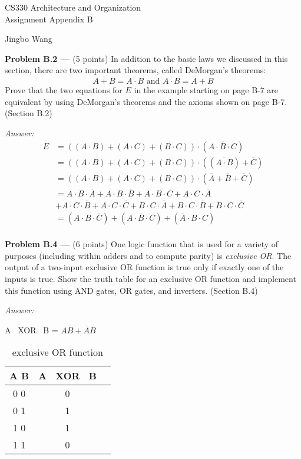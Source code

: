 \documentclass[11pt]{article}
\newcommand{\problem}[1]{\textbf{Problem #1 ---} }
\newcommand{\answer}{{\color{red}\textit{Answer: }}}
\begin{document}
\thispagestyle{empty}

\begin{center}
{\large CS330 Architecture and Organization}\\
Assignment Appendix B
\end{center}

\begin{flushright}
Jingbo Wang
\end{flushright}

\problem{B.2}(5 points) In addition to the basic laws we discussed in this section, there are two important theorems, called DeMorgan's theorems:
\[ \overline{A+B} = \overline{A}\cdot\overline{B} \text{ and } \overline{A\cdot B}=\overline{A}+\overline{B} \]
Prove that the two equations for $E$ in the example starting on page B-7 are equivalent by using DeMorgan's theorems and the axioms shown on page B-7. (Section B.2)

\answer
\begin{align*}
    E &= ((A\cdot B)+(A \cdot C)+(B \cdot C))\cdot(\overline{A\cdot B \cdot C}) \\
      &= ((A\cdot B)+(A \cdot C)+(B \cdot C))\cdot((\overline{A \cdot B}) + \overline{C}) \\
      &= ((A\cdot B)+(A \cdot C)+(B \cdot C))\cdot(\overline{A} + \overline{B} +         
         \overline{C}) \\
      &= A \cdot B \cdot \overline{A} + A \cdot B \cdot \overline{B} + A \cdot B \cdot 
         \overline{C} + A \cdot C \cdot \overline{A}\\
      &+ A \cdot C \cdot \overline{B} + A \cdot C 
      \cdot \overline{C} + B \cdot C \cdot \overline{A} + B \cdot C \cdot \overline{B} 
      + B \cdot C \cdot \overline{C} \\
      &= (A \cdot B \cdot \overline{C})
         +(A \cdot \overline{B} \cdot C)
         +(\overline{A} \cdot B \cdot C) \\
\end{align*}


\problem{B.4}(6 points) One logic function that is used for a variety of purposes (including within adders and to compute parity) is \textit{exclusive OR}.  The output of a two-input exclusive OR function is true only if exactly one of the inputs is true.  Show the truth table for an exclusive OR function and implement this function using AND gates, OR gates, and inverters. (Section B.4)

\answer

A \ XOR \ B = $A\overline{B}+\overline{A}B$
\begin{table}[htbp]
    \centering
    \begin{tabular}{c|c c}
         A B & A \ XOR \ B\\
         \hline
         0 0 & 0 \\
         0 1 & 1 \\
         1 0 & 1\\
         1 1 & 0
    \end{tabular}
    \caption{exclusive OR function}
    \label{tab:my_label}
\end{table}
\end{document}
